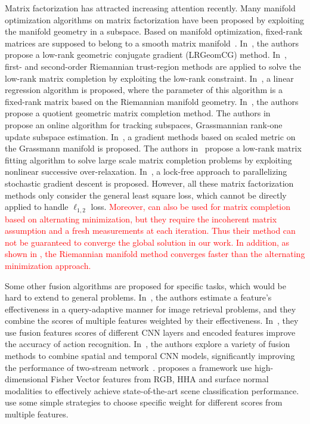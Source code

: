 \documentclass[10pt,twocolumn,letterpaper]{article}
\def\yanred{\textcolor{red}}
\begin{document}
Matrix factorization has attracted increasing attention recently.
Many manifold optimization algorithms on matrix factorization have been proposed by exploiting the manifold geometry in a subspace.
Based on manifold optimization, fixed-rank matrices are supposed to belong to a smooth matrix manifold~\cite{Absil2008OAMM,vandereycken2013lowrank}.
In~\cite{vandereycken2013lowrank}, the authors propose a low-rank geometric conjugate gradient (LRGeomCG) method.
In~\cite{rtrmc2011boumal}, first- and second-order Riemannian trust-region methods are applied to solve the low-rank matrix completion by exploiting the low-rank constraint.
In~\cite{Bonnabel2011}, a linear regression algorithm is proposed, where the parameter of this algorithm is a fixed-rank matrix based on the Riemannian manifold geometry.
In~\cite{Mishra2012}, the authors propose a quotient geometric matrix completion method.
The authors in~\cite{grouse2010Balzano} propose an online algorithm for tracking subspaces, Grassmannian rank-one update subspace estimation.
In~\cite{ngonips2012scaled}, a gradient methods based on scaled metric on the Grassmann manifold is proposed.
The authors in~\cite{Wen2012} propose a low-rank matrix fitting algorithm to solve large scale matrix completion problems by exploiting nonlinear successive over-relaxation.
In~\cite{RechtNIPS2011hogwild}, a lock-free approach to parallelizing stochastic gradient descent is proposed.
However, all these matrix factorization methods only consider the general least square loss, which cannot be directly applied to handle $\ell_{1,2}$ loss.
\yanred{
Moreover, \cite{jain2013low} can also be used for matrix completion based on alternating minimization,
but they require the incoherent matrix assumption and a fresh measurements at each iteration.
Thus their method can not be guaranteed to converge the global solution in our work.
In addition, as shown in \cite{vandereycken2013lowrank}, the Riemannian manifold method converges faster than the alternating minimization approach.
}

Some other fusion algorithms are proposed for specific tasks, which would be hard to extend to general problems.
In~\cite{zheng2015query}, the authors estimate a feature’s effectiveness in a query-adaptive manner for image retrieval problems,
and they combine the scores of multiple features weighted by their effectiveness.
In~\cite{zha2015exploiting}, they use fusion features scores of different CNN layers and encoded features improve the accuracy of action recognition.
In~\cite{feichtenhofer2016convolutional}, the authors explore a variety of fusion methods to combine spatial and temporal CNN models, significantly improving the performance of two-stream network~\cite{simonyan2014two}.
\cite{wangmodality} proposes a framework use high-dimensional Fisher Vector features from RGB, HHA and surface normal modalities to effectively achieve state-of-the-art scene classification performance.
\cite{Wang_Transformation,tapaswi2015movieqa,yaohighlight} use some simple strategies to choose specific weight for different scores from multiple features.
\end{document}
